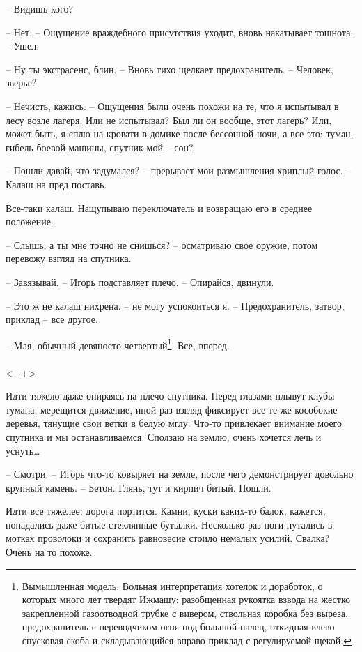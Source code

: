 \documentclass[a4paper]{book}
\begin{document}
-- Видишь кого? 

-- Нет. -- Ощущение враждебного присутствия уходит, вновь накатывает тошнота. -- Ушел. 

-- Ну ты экстрасенс, блин. -- Вновь тихо щелкает предохранитель. -- Человек, зверье? 

-- Нечисть, кажись. -- Ощущения были очень похожи на те, что я испытывал в лесу возле лагеря. Или не испытывал? Был ли он вообще, этот лагерь? Или, может быть, я сплю на кровати в домике после бессонной ночи, а все это: туман, гибель боевой машины, спутник мой -- сон? 

-- Пошли давай, что задумался? -- прерывает мои размышления хриплый голос. -- Калаш на пред поставь. 

Все-таки калаш. Нащупываю переключатель и возвращаю его в среднее положение.

-- Слышь, а ты мне точно не снишься? -- осматриваю свое оружие, потом перевожу взгляд на спутника.

-- Завязывай. -- Игорь подставляет плечо. -- Опирайся, двинули.

-- Это ж не калаш нихрена. -- не могу успокоиться я. -- Предохранитель, затвор, приклад -- все другое.  

-- Мля, обычный девяносто четвертый\footnote{Вымышленная модель. Вольная интерпретация хотелок и доработок, о которых много лет твердят Ижмашу: разобщенная рукоятка взвода на жестко закрепленной газоотводной трубке с вивером, ствольная коробка без выреза, предохранитель с переводчиком огня под большой палец, откидная влево спусковая скоба и складывающийся вправо приклад с регулируемой щекой.}. Все, вперед. 

\paragraph{}<++>

Идти тяжело даже опираясь на плечо спутника. Перед глазами плывут клубы тумана, мерещится движение, иной раз взгляд фиксирует все те же кособокие деревья, тянущие свои ветки в белую мглу. Что-то привлекает внимание моего спутника и мы останавливаемся. Сползаю на землю, очень хочется лечь и уснуть\ldots

-- Смотри. -- Игорь что-то ковыряет на земле, после чего демонстрирует довольно крупный камень. -- Бетон. Глянь, тут и кирпич битый. Пошли. 

Идти все тяжелее: дорога портится. Камни, куски каких-то балок, кажется, попадались даже битые стеклянные бутылки. Несколько раз ноги путались в мотках проволоки и сохранить равновесие стоило немалых усилий. Свалка? Очень на то похоже. 
\end{document}

